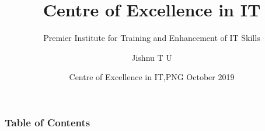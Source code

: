 \documentclass[hyperref={bookmarks=false},aspectratio=169]{beamer}
\title[CEIT]
{\bfseries{Centre of Excellence in IT}}
\subtitle{Premier Institute for Training and Enhancement of IT Skills}
\author[Jishnu T U] %
{Jishnu T U\inst{1} } %
\institute[CEIT]
{
  \inst{1}
  Trainer\\
  Centre of Excellence in IT,PNG
}
\date[CEIT, 2014]
{Centre of Excellence in IT,PNG October 2019}
\begin{document}
\frame{\titlepage}  %

\begin{frame}
\frametitle{Table of Contents}
\tableofcontents
\end{frame}







%
%

%
\end{document}
